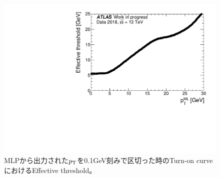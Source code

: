 \begin{figure}[tb]
  \centering
  \hspace*{-1cm}
  \includegraphics[clip, width=12cm]{fig/5/Data_Effective.pdf}
  \caption{MLPから出力された$p_{\rm{T}}$を0.1GeV刻みで区切った時のTurn-on curveにおけるEffective threshold。}
  \label{fig:Effictive_thr_v1}
\end{figure}


